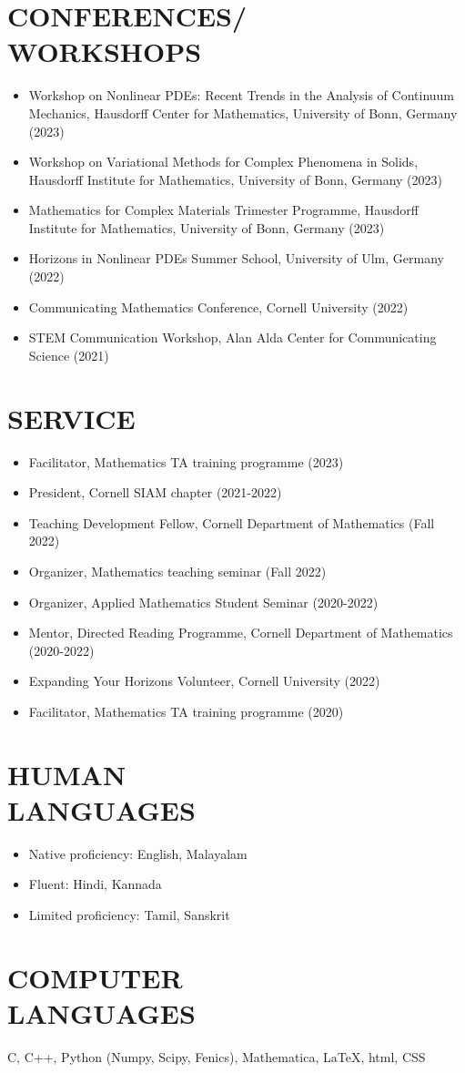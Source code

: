 \documentclass[margin]{res} %
\begin{document}
\begin{resume}
\section{CONFERENCES/\\WORKSHOPS}
\begin{itemize}
	\item Workshop on Nonlinear PDEs: Recent Trends in the Analysis of Continuum Mechanics, Hausdorff Center for Mathematics, University of Bonn, Germany (2023)
	\item Workshop on Variational Methods for Complex Phenomena in Solids, Hausdorff Institute for Mathematics, University of Bonn, Germany (2023)
	\item Mathematics for Complex Materials Trimester Programme, Hausdorff Institute for Mathematics, University of Bonn, Germany (2023)
	\item Horizons in Nonlinear PDEs Summer School, University of Ulm, Germany (2022)
	\item Communicating Mathematics Conference, Cornell University (2022)
	\item STEM Communication Workshop, Alan Alda Center for Communicating Science (2021)
\end{itemize}

\section{SERVICE}
\begin{itemize}
	\item Facilitator, Mathematics TA training programme (2023)
	\item President, Cornell SIAM chapter (2021-2022)
	\item Teaching Development Fellow, Cornell Department of Mathematics (Fall 2022)
	\item Organizer, Mathematics teaching seminar (Fall 2022)
	\item Organizer, Applied Mathematics Student Seminar (2020-2022)
	\item Mentor, Directed Reading Programme, Cornell Department of Mathematics (2020-2022)
	\item Expanding Your Horizons Volunteer, Cornell University (2022)
	\item Facilitator, Mathematics TA training programme (2020)
\end{itemize}

\section{HUMAN \\ LANGUAGES}
\begin{itemize}
	\item Native proficiency: English, Malayalam
	\item Fluent: Hindi, Kannada
	\item Limited proficiency: Tamil, Sanskrit
\end{itemize}

\section{COMPUTER \\ LANGUAGES}
C, C++, Python (Numpy, Scipy, Fenics), Mathematica, \LaTeX, html, CSS

\end{resume}
\end{document}
